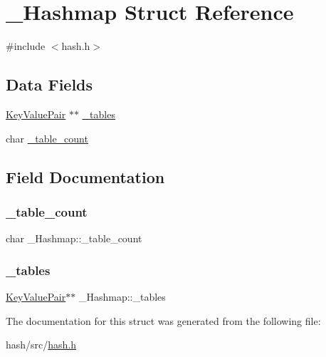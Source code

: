 \hypertarget{struct__Hashmap}{}\section{\+\_\+\+Hashmap Struct Reference}
\label{struct__Hashmap}


{\ttfamily \#include $<$hash.\+h$>$}

\subsection*{Data Fields}
\begin{DoxyCompactItemize}
\item 
\mbox{\hyperlink{hash_8h_a7007e96d0b254e48465c7b9bb6d179de}{Key\+Value\+Pair}} $\ast$$\ast$ \mbox{\hyperlink{struct__Hashmap_aae269efcb3bd2ef490fff8f9b656f24a}{\+\_\+tables}}
\item 
char \mbox{\hyperlink{struct__Hashmap_aef808183503599d6678222736c8eb72e}{\+\_\+table\+\_\+count}}
\end{DoxyCompactItemize}


\subsection{Field Documentation}
\mbox{\label{struct__Hashmap_aef808183503599d6678222736c8eb72e}} 
\subsubsection{\texorpdfstring{\+\_\+table\+\_\+count}{\_table\_count}}
{\footnotesize\ttfamily char \+\_\+\+Hashmap\+::\+\_\+table\+\_\+count}

\mbox{\label{struct__Hashmap_aae269efcb3bd2ef490fff8f9b656f24a}} 
\subsubsection{\texorpdfstring{\+\_\+tables}{\_tables}}
{\footnotesize\ttfamily \mbox{\hyperlink{hash_8h_a7007e96d0b254e48465c7b9bb6d179de}{Key\+Value\+Pair}}$\ast$$\ast$ \+\_\+\+Hashmap\+::\+\_\+tables}



The documentation for this struct was generated from the following file\+:\begin{DoxyCompactItemize}
\item 
hash/src/\mbox{\hyperlink{hash_8h}{hash.\+h}}\end{DoxyCompactItemize}

